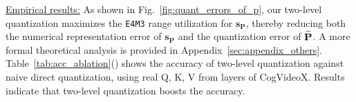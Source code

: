\underline{Empirical results:} As shown in Fig.~\ref{fig:quant_errors_of_p}, our two-level quantization maximizes the \texttt{E4M3} range utilization for $\mathbf{s_P}$, thereby reducing both the numerical representation error of $\mathbf{s_P}$ and the quantization error of $\widetilde{\mathbf{P}}$. A more formal theoretical analysis is provided in Appendix~\ref{sec:appendix_others}. 
Table~\ref{tab:acc_ablation}() shows the accuracy of two-level quantization against naive direct quantization, using real Q, K, V from layers of CogVideoX. Results indicate that two-level quantization boosts the accuracy.








